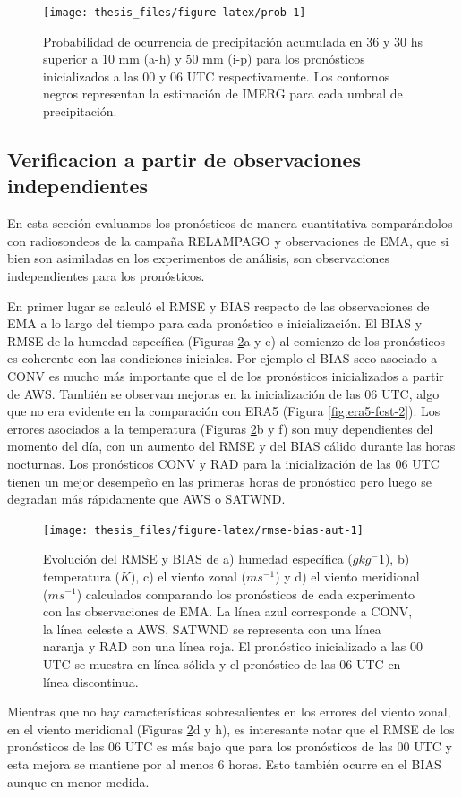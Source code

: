 \documentclass[12pt,oneside,a4paper]{reedthesis}
\begin{document}
\begin{figure}

{\centering \texttt{[image: thesis\_files/figure-latex/prob-1]} 

}

\caption{Probabilidad de ocurrencia de precipitación acumulada en 36 y 30 hs superior a 10 mm (a-h) y 50 mm (i-p) para los pronósticos inicializados a las 00 y 06 UTC respectivamente. Los contornos negros representan la estimación de IMERG para cada umbral de precipitación.}\label{fig:prob}
\end{figure}
\hypertarget{verificacion-a-partir-de-observaciones-independientes}{%
\subsection{Verificacion a partir de observaciones independientes}\label{verificacion-a-partir-de-observaciones-independientes}}

En esta sección evaluamos los pronósticos de manera cuantitativa comparándolos con radiosondeos de la campaña RELAMPAGO y observaciones de EMA, que si bien son asimiladas en los experimentos de análisis, son observaciones independientes para los pronósticos.

En primer lugar se calculó el RMSE y BIAS respecto de las observaciones de EMA a lo largo del tiempo para cada pronóstico e inicialización. El BIAS y RMSE de la humedad específica (Figuras \ref{fig:rmse-bias-aut}a y e) al comienzo de los pronósticos es coherente con las condiciones iniciales. Por ejemplo el BIAS seco asociado a CONV es mucho más importante que el de los pronósticos inicializados a partir de AWS. También se observan mejoras en la inicialización de las 06 UTC, algo que no era evidente en la comparación con ERA5 (Figura \ref{fig:era5-fcst-2}). Los errores asociados a la temperatura (Figuras \ref{fig:rmse-bias-aut}b y f) son muy dependientes del momento del día, con un aumento del RMSE y del BIAS cálido durante las horas nocturnas. Los pronósticos CONV y RAD para la inicialización de las 06 UTC tienen un mejor desempeño en las primeras horas de pronóstico pero luego se degradan más rápidamente que AWS o SATWND.


\begin{figure}
\texttt{[image: thesis\_files/figure-latex/rmse-bias-aut-1]} \caption{Evolución del RMSE y BIAS de a) humedad específica (\(gkg{^-1}\)), b) temperatura (\(K\)), c) el viento zonal (\(ms^{-1}\)) y d) el viento meridional (\(ms^{-1}\)) calculados comparando los pronósticos de cada experimento con las observaciones de EMA. La línea azul corresponde a CONV, la línea celeste a AWS, SATWND se representa con una línea naranja y RAD con una línea roja. El pronóstico inicializado a las 00 UTC se muestra en línea sólida y el pronóstico de las 06 UTC en línea discontinua.}\label{fig:rmse-bias-aut}
\end{figure}
Mientras que no hay características sobresalientes en los errores del viento zonal, en el viento meridional (Figuras \ref{fig:rmse-bias-aut}d y h), es interesante notar que el RMSE de los pronósticos de las 06 UTC es más bajo que para los pronósticos de las 00 UTC y esta mejora se mantiene por al menos 6 horas. Esto también ocurre en el BIAS aunque en menor medida.
\end{document}
